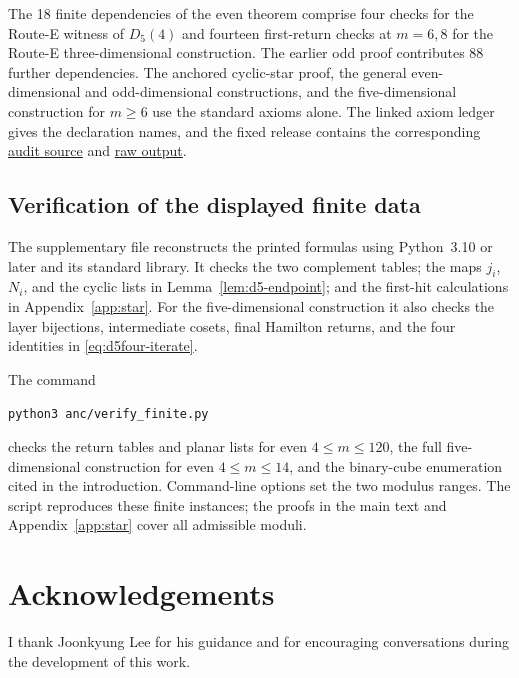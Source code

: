 \documentclass[11pt,reqno]{amsart}
\numberwithin{equation}{section}
\theoremstyle{definition}
\theoremstyle{remark}
\begin{document}
The 18 finite dependencies of the even theorem comprise four checks for
the Route-E witness of $D_5(4)$ and fourteen first-return checks at $m=6,8$
for the Route-E three-dimensional construction. The earlier odd proof
contributes 88 further dependencies. The anchored cyclic-star proof,
the general even-dimensional and odd-dimensional constructions, and
the five-dimensional construction for $m\ge6$ use the standard axioms alone.
The linked axiom ledger gives the declaration names, and the fixed
release contains the corresponding
\href{https://github.com/aria1th/Torus-Hamilton-Decomposition-Program/blob/4900983c4f4be61ed90b008c6063cddd6c91d4e2/evidence/lean_audit_20260911/final-control-check/FinalAudit.lean}{audit source}
and
\href{https://github.com/aria1th/Torus-Hamilton-Decomposition-Program/blob/4900983c4f4be61ed90b008c6063cddd6c91d4e2/evidence/lean_audit_20260911/final-control-check/axioms.log}{raw output}.

\subsection{Verification of the displayed finite data}
The supplementary file  reconstructs the
printed formulas using Python~3.10 or later and its standard library.
It checks the two complement tables; the maps $j_i$, $N_i$, and the
cyclic lists in Lemma~\ref{lem:d5-endpoint}; and the first-hit calculations
in Appendix~\ref{app:star}. For the five-dimensional construction it
also checks the layer bijections, intermediate cosets, final Hamilton
returns, and the four identities in \eqref{eq:d5four-iterate}.

The command
\begin{center}\small
\texttt{python3 anc/verify\_finite.py}
\end{center}
checks the return tables and planar lists for even $4\le m\le120$,
the full five-dimensional construction for even $4\le m\le14$, and the
binary-cube enumeration cited in the introduction. Command-line options
set the two modulus ranges. The script reproduces these finite instances;
the proofs in the main text and Appendix~\ref{app:star} cover all
admissible moduli.

\section*{Acknowledgements}
I thank Joonkyung Lee for his guidance and for encouraging conversations
during the development of this work.
\end{document}
